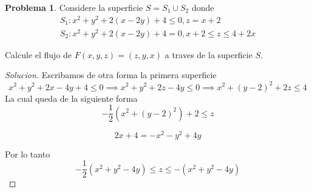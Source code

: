 \documentclass{article}
\theoremstyle{definition}
\newtheorem{problem}{Problema}
\newenvironment{solution}{\begin{proof}[Solucion]}{\end{proof}}
\begin{document}
\begin{problem}
  Considere la superficie $S = S_{1} \cup S_{2}$ donde
  \begin{gather*}
    S_{1} : x^{2} + y^{2} + 2(x - 2y) + 4 \leq 0, z = x + 2\\
    S_{2} : x^{2} + y^{2} + 2(x - 2y) + 4 = 0, x + 2 \leq z \leq 4 + 2x
  \end{gather*}

  Calcule el flujo de $F(x, y, z) = (z, y, x)$ a traves de la superficie $S$.
\end{problem}
\begin{solution}
  Escribamos de otra forma la primera superficie
  \begin{equation*}
    x^{2} + y^{2} + 2x - 4y + 4 \leq 0 \implies x^{2} + y^{2} + 2z - 4y \leq 0 \implies x^{2} + (y - 2)^{2} + 2z \leq 4
  \end{equation*}
  La cual queda de la siguiente forma
  \begin{equation*}
    -\frac{1}{2}(x^{2} + (y - 2)^{2}) + 2 \leq z
  \end{equation*}

  \begin{equation*}
    2x + 4 = -x^{2} -y^{2} + 4y
  \end{equation*}

  Por lo tanto
  \begin{equation*}
    -\frac{1}{2}(x^{2} + y^{2} - 4y) \leq z \leq -(x^{2} + y^{2} - 4y)
  \end{equation*}
\end{solution}
\end{document}
